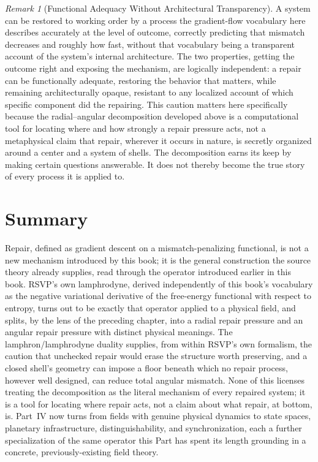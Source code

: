\documentclass[11pt,fleqn]{book}
\numberwithin{equation}{chapter}
\theoremstyle{plain}
\theoremstyle{definition}
\theoremstyle{remark}
\newtheorem{remark}[theorem]{Remark}
\begin{document}
\begin{remark}[Functional Adequacy Without Architectural Transparency]
A system can be restored to working order by a process the gradient-flow vocabulary here describes accurately at the level of outcome, correctly predicting that mismatch decreases and roughly how fast, without that vocabulary being a transparent account of the system's internal architecture. The two properties, getting the outcome right and exposing the mechanism, are logically independent: a repair can be functionally adequate, restoring the behavior that matters, while remaining architecturally opaque, resistant to any localized account of which specific component did the repairing. This caution matters here specifically because the radial--angular decomposition developed above is a computational tool for locating where and how strongly a repair pressure acts, not a metaphysical claim that repair, wherever it occurs in nature, is secretly organized around a center and a system of shells. The decomposition earns its keep by making certain questions answerable. It does not thereby become the true story of every process it is applied to.
\end{remark}

\section{Summary}

Repair, defined as gradient descent on a mismatch-penalizing functional, is not a new mechanism introduced by this book; it is the general construction the source theory already supplies, read through the operator introduced earlier in this book. RSVP's own lamphrodyne, derived independently of this book's vocabulary as the negative variational derivative of the free-energy functional with respect to entropy, turns out to be exactly that operator applied to a physical field, and splits, by the lens of the preceding chapter, into a radial repair pressure and an angular repair pressure with distinct physical meanings. The lamphron/lamphrodyne duality supplies, from within RSVP's own formalism, the caution that unchecked repair would erase the structure worth preserving, and a closed shell's geometry can impose a floor beneath which no repair process, however well designed, can reduce total angular mismatch. None of this licenses treating the decomposition as the literal mechanism of every repaired system; it is a tool for locating where repair acts, not a claim about what repair, at bottom, is. Part~IV now turns from fields with genuine physical dynamics to state spaces, planetary infrastructure, distinguishability, and synchronization, each a further specialization of the same operator this Part has spent its length grounding in a concrete, previously-existing field theory.
\end{document}
